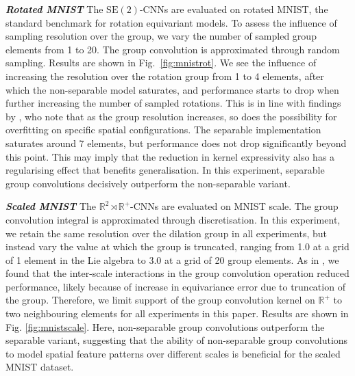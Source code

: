 \documentclass[nohyperref]{article}
\theoremstyle{plain}
\theoremstyle{definition}
\theoremstyle{remark}
\newcommand{\R}{\mathbb{R}}
\begin{document}
\textbf{\textit{Rotated MNIST}} \label{sec:rotmnistexperiments} The $\mathrm{SE(2)}$-CNNs are evaluated on rotated MNIST, the standard benchmark for rotation equivariant models. To assess the influence of sampling resolution over the group, we vary the number of sampled group elements from 1 to 20. The group convolution is approximated through random sampling. Results are shown in Fig.~\ref{fig:mnistrot}. We see the influence of increasing the resolution over the rotation group from 1 to 4 elements, after which the non-separable model saturates, and performance starts to drop when further increasing the number of sampled rotations. This is in line with findings by \citet{bekkers2018roto}, who note that as the group resolution increases, so does the possibility for overfitting on specific spatial configurations. The separable implementation saturates around 7 elements, but performance does not drop significantly beyond this point. This may imply that the reduction in kernel expressivity also has a regularising effect that benefits generalisation. In this experiment, separable group convolutions decisively outperform the non-separable variant.

\textbf{\textit{Scaled MNIST}} The $\R^2 {\rtimes} \R^+$-CNNs are evaluated on MNIST scale. The group convolution integral is approximated through discretisation. In this experiment, we retain the same resolution over the dilation group in all experiments, but instead vary the value at which the group is truncated, ranging from 1.0 at a grid of 1 element in the Lie algebra to 3.0 at a grid of 20 group elements. As in \citet{sosnovik2019scale}, we found that the inter-scale interactions in the group convolution operation reduced performance, likely because of increase in equivariance error due to truncation of the group. Therefore, we limit support of the group convolution kernel on $\R^+$ to two neighbouring elements for all experiments in this paper. Results are shown in Fig. \ref{fig:mnistscale}. Here, non-separable group convolutions outperform the separable variant, suggesting that the ability of non-separable group convolutions to model spatial feature patterns over different scales is beneficial for the scaled MNIST dataset.
\end{document}
